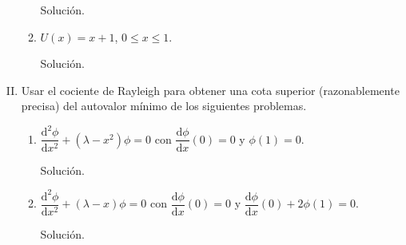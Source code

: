 \documentclass[fleqn]{article}
\newcommand{\despar}[3]{\dfrac{\mathrm{d}^#1 #2}{\mathrm{d} #3^#1}}
\newcommand{\depar}[2]{\dfrac{\mathrm{d} #1}{\mathrm{d} #2}}
\begin{document}
\begin{enumerate}[I.]
\begin{enumerate}
			Solución.
			
			\normalfont




			\bfseries
			
			\item $ U(x) = x + 1 $, $ 0 \leq x \leq 1 $.
			
			Solución.
			
			\normalfont



		\end{enumerate}
		

		\bfseries
			
		\item Usar el cociente de Rayleigh para obtener una cota superior (razonablemente precisa) del autovalor mínimo de los siguientes problemas.
		
		\begin{enumerate}
			\item $ \despar{2}{\phi}{x} + (\lambda - x^2) \phi = 0 $ con $ \depar{\phi}{x} (0) = 0 $ y $ \phi (1) = 0 $.
			
			Solución.
			
			\normalfont




			\bfseries
			
			\item $ \despar{2}{\phi}{x} + (\lambda - x) \phi = 0 $ con $ \depar{\phi}{x} (0) = 0 $ y $ \depar{\phi}{x} (0) + 2 \phi (1) = 0 $.
			
			Solución.
			
			\normalfont



		\end{enumerate}
	\end{enumerate}
\end{document}
